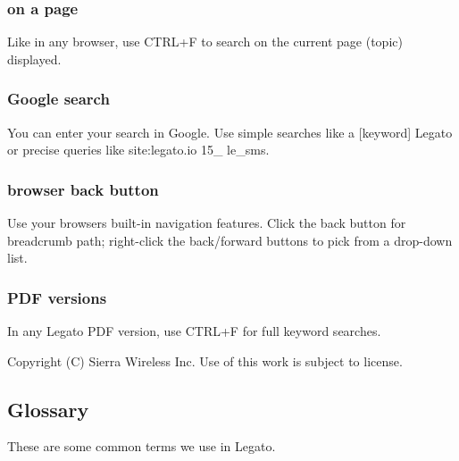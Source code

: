 \subsubsection*{on a page}

Like in any browser, use {\ttfamily C\+T\+R\+L+\+F} to search on the current page (topic) displayed.

\subsubsection*{Google search}

You can enter your search in Google. Use simple searches like a {\ttfamily \mbox{[}keyword\mbox{]} Legato} or precise queries like {\ttfamily  site\+:legato.\+io 15\+\_ le\+\_\+sms}.

\subsubsection*{browser back button}

Use your browser\textquotesingle{}s built-\/in navigation features. Click the back button for breadcrumb path; right-\/click the back/forward buttons to pick from a drop-\/down list.

\subsubsection*{P\+D\+F versions}

In any Legato P\+D\+F version, use {\ttfamily C\+T\+R\+L+\+F} for full keyword searches.





Copyright (C) Sierra Wireless Inc. Use of this work is subject to license. \hypertarget{aboutDocsGlossary}{}\subsection{Glossary}\label{aboutDocsGlossary}
These are some common terms we use in Legato.

